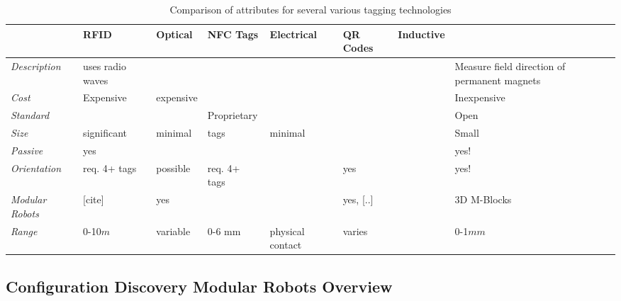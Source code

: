 \begin{table*}[t]
	\centering
	\caption{Comparison of attributes for several various tagging technologies}
	\newcommand{\wdd}{1.9cm}
	\begin{tabular}{ p{1.7 cm} p{\wdd}  p{\wdd} p{\wdd} p{\wdd} p{\wdd} p{\wdd} p{\wdd}  }
		\hline
		\addlinespace[1ex]
											& RFID 				& Optical		& NFC Tags 		& Electrical 		& QR Codes 	& Inductive	& \bf{\tagNamePlural} \\ %
		\hline

		\textit{Description}				& uses radio waves	& 				& 				& 					& 	  		&			& Measure field direction of permanent magnets \\

\addlinespace[1ex]	 \textit{Cost}			& Expensive			& expensive		& 				& 					& 	 		&			& Inexpensive \\
		
\addlinespace[1ex] 	\textit{Standard}		& 					&  				& Proprietary	& 					& 			&			& Open \\
		
\addlinespace[1ex] 	\textit{Size} 			& significant 		& minimal 		& tags  		& minimal	  		&       	&			& Small		  \\
		
\addlinespace[1ex]	\textit{Passive} 		& yes				& 				&  				&	 				&			&			& yes!		  \\
		
\addlinespace[1ex] 	\textit{Orientation} 	& req. 4+ tags 		& possible 		& req. 4+ tags 	&	 				& yes		&			& yes!		\\
		
\addlinespace[1ex] 	\textit{Modular Robots}	& [cite]			& yes			&	  			& 					& yes, [..]	&	~\cite{TosunDaveyLiuYim-IROS2016}		& 3D M-Blocks\\
		
\addlinespace[1ex] 	\textit{Range}			& 0-10$m$			& variable		& 0-6 mm		& physical contact	& varies	&			& 0-1$mm$	\\
	\end{tabular}
	\label{tab:tagTech}
\end{table*}

\subsection{Configuration Discovery Modular Robots Overview}
\label{sec:RWconfiguration}
	
